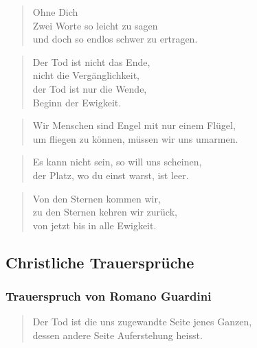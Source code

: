 \documentclass[ngerman,a4paper,11pt]{scrreprt}
\begin{document}
\begin{verse}
Ohne Dich \\
Zwei Worte so leicht zu sagen \\
und doch so endlos schwer zu ertragen. \\
\end{verse}

\begin{verse}
Der Tod ist nicht das Ende, \\
nicht die Vergänglichkeit, \\
der Tod ist nur die Wende, \\
Beginn der Ewigkeit. \\
\end{verse}

\begin{verse}
Wir Menschen sind Engel mit nur einem Flügel, \\
um fliegen zu können, müssen wir uns umarmen. \\
\end{verse}

\begin{verse}
Es kann nicht sein, so will uns scheinen, \\
der Platz, wo du einst warst, ist leer. \\
\end{verse}

\begin{verse}
Von den Sternen kommen wir, \\
zu den Sternen kehren wir zurück, \\
von jetzt bis in alle Ewigkeit. \\
\end{verse}

\subsection{Christliche Trauersprüche}
\label{sec-2-1-2-2}

\subsubsection*{Trauerspruch von Romano Guardini}
\label{sec-2-1-2-2-1}

\begin{verse}
Der Tod ist die uns zugewandte Seite jenes Ganzen, \\
dessen andere Seite Auferstehung heisst. \\
\end{verse}
\end{document}
